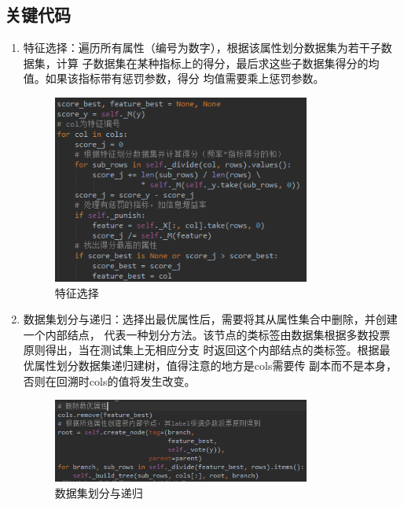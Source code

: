 \documentclass[UTF8,a4paper,12pt]{article}
\begin{document}
\subsection{关键代码}
\begin{enumerate}[itemindent=0.5em,label=\arabic*、]
  \item 特征选择：遍历所有属性（编号为数字），根据该属性划分数据集为若干子数据集，计算
  子数据集在某种指标上的得分，最后求这些子数据集得分的均值。如果该指标带有惩罚参数，得分
  均值需要乘上惩罚参数。
  \begin{figure}[h]
  \begin{center}
  \includegraphics[width=0.8\textwidth]{p4.png} %
  \caption{特征选择}
  \end{center}
  \end{figure}
  \item 数据集划分与递归：选择出最优属性后，需要将其从属性集合中删除，并创建一个内部结点，
  代表一种划分方法。该节点的类标签由数据集根据多数投票原则得出，当在测试集上无相应分支
  时返回这个内部结点的类标签。根据最优属性划分数据集递归建树，值得注意的地方是cols需要传
  副本而不是本身，否则在回溯时cols的值将发生改变。
  \begin{figure}[h]
  \begin{center}
  \includegraphics[width=0.8\textwidth]{p5.png} %
  \caption{数据集划分与递归}
  \end{center}

\end{figure}
\end{enumerate}
\end{document}
